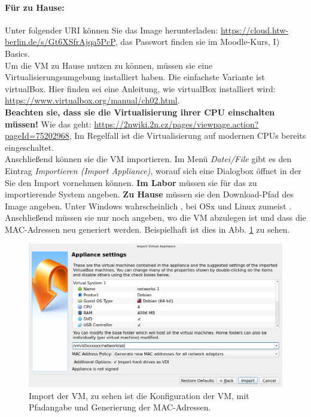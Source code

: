\documentclass[paper=a4,fontsize=11pt]{scrartcl}%
\numberwithin{equation}{section}
\begin{document}
\paragraph{Für zu Hause:} Unter folgender URI können Sie das Image herunterladen: \url{https://cloud.htw-berlin.de/s/Gt6XSfrAjqa5PcP}, das Passwort finden sie im Moodle-Kurs, I) Basics.\\
Um die VM zu Hause nutzen zu können, müssen sie eine Virtualisierungsumgebung installiert haben. Die einfachste Variante ist virtualBox. Hier finden sei eine Anleitung, wie virtualBox installiert wird: \url{https://www.virtualbox.org/manual/ch02.html}.\\
\textbf{Beachten sie, dass sie die Virtualisierung ihrer CPU einschalten müssen!} Wie das geht: \url{https://2nwiki.2n.cz/pages/viewpage.action?pageId=75202968}, Im Regelfall ist die Virtualisierung auf modernen CPUs bereits eingeschaltet.\\
Anschließend können sie die VM importieren. Im Menü \emph{Datei/File} gibt es den Eintrag \emph{Importieren (Import Appliance)}, worauf sich eine Dialogbox öffnet in der Sie den Import vornehmen können. \textbf{Im Labor} müssen sie für das zu importierende System  angeben. \textbf{Zu Hause} müssen sie den Download-Pfad des Image angeben. Unter Windows wahrscheinlich , bei OSx und Linux zumeist .\\
Anschließend müssen sie nur noch angeben, wo die VM abzulegen ist und dass die MAC-Adressen neu generiert werden. Beispielhaft ist dies in Abb. \ref{import_vm} zu sehen.
\begin{figure}[H]
	\centering
	\includegraphics[scale=0.3]{vm_import}
	\caption{Import der VM, zu sehen ist die Konfiguration der VM, mit Pfadangabe und Generierung der MAC-Adressen.}
	\label{import_vm}
\end{figure} 
\end{document}
